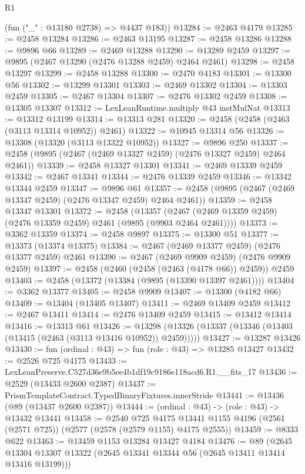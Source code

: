 \begin{lexlean}{R1}
\begin{coremodule}
      (fun ("_" : @13180 @2738) => @4437 @183))
@13284 := @2463 @4179
@13285 := @2458 @13284
@13286 := @2463 @13195
@13287 := @2458 @13286
@13288 := @9896 @66
@13289 := @2469 @13288
@13290 := @13289 @2459
@13297 := @9895 (@2467 @13290 (@2476 @13288 @2459) @2464 @2461)
@13298 := @2458 @13297
@13299 := @2458 @13288
@13300 := @2470 @4183
@13301 := @13300 @56
@13302 := @13299 @13301
@13303 := @2469 @13302
@13304 := @13303 @2459
@13305 := @2467 @13304
@13307 := @2476 @13302 @2459
@13308 := @13305 @13307
@13312 := LexLeanRuntime.multiply @43 instMulNat
@13313 := @13312 @13199
@13314 := @13313 @281
@13320 := @2458 (@2458 (@2463 (@3113 @13314 @10952)) @2461)
@13322 := @10945 @13314 @56
@13326 := @13308 (@13320 (@3113 @13322 @10952))
@13327 := @9896 @250
@13337 := @2458 (@9895 (@2467 (@2469 @13327 @2459) (@2476 @13327 @2459) @2464 @2461))
@13339 := @2458 @13327 @13301
@13341 := @2469 @13339 @2459
@13342 := @2467 @13341
@13344 := @2476 @13339 @2459
@13346 := @13342 @13344 @2459
@13347 := @9896 @61
@13357 := @2458 (@9895 (@2467 (@2469 @13347 @2459) (@2476 @13347 @2459) @2464 @2461))
@13359 := @2458 @13347 @13301
@13372 := @2458
    (@13357 (@2467 (@2469 @13359 @2459) (@2476 @13359 @2459) @2461 (@9895 (@9903 @2464 @2461))))
@13373 := @3362 @13359
@13374 := @2458 @9897
@13375 := @13300 @51
@13377 := @13373 (@13374 @13375)
@13384 := @2467 (@2469 @13377 @2459) (@2476 @13377 @2459) @2461
@13390 := @2467 (@2469 @9909 @2459) (@2476 @9909 @2459)
@13397 := @2458 (@2460 (@2458 (@2463 (@4178 @66)) @2459)) @2459
@13403 := @2458 (@13372 (@13384 (@9895 (@13390 @13397 @2461))))
@13404 := @3362 @13377
@13405 := @2458 @9909
@13407 := @13300 (@4182 @66)
@13409 := @13404 (@13405 @13407)
@13411 := @2469 @13409 @2459
@13412 := @2467 @13411
@13414 := @2476 @13409 @2459
@13415 := @13412 @13414
@13416 := @13313 @61
@13426 := @13298 (@13326 (@13337 (@13346 (@13403 (@13415 (@2463 (@3113 @13416 @10952)) @2459)))))
@13427 := @13287 @13426
@13430 := fun (ordinal : @43) => fun (role : @43) => @13285 @13427
@13432 := @2526 @725 @4175
@13433 := LexLeanPreserve.C527d36e9b5ee4b1df19c9186e118acd6.R1.__fits_17
@13436 := @2529 (@13433 @2600 @2387)
@13437 := PrismTemplateContract.TypedBinaryFixtures.innerStride
@13441 := @13436 (@89 (@13437 @2600 @2387))
@13444 := (ordinal : @43) -> (role : @43) -> @13432 @13441
@13458 := @2540
    @725
    @4175
    @13441
    @1155
    @4196
    (@2561 (@2571 @725))
    (@2577 (@2578 (@2579 @1155) @4175 @2555))
@13459 := @8333 @622
@13463 := @13459 @1153 @13284 @13427 @4184
@13476 := @89
    (@2645 @13304 @13307 @13322 (@2645 @13341 @13344 @56 (@2645 @13411 @13414 @13416 @13199)))

\end{coremodule}
\end{lexlean}
